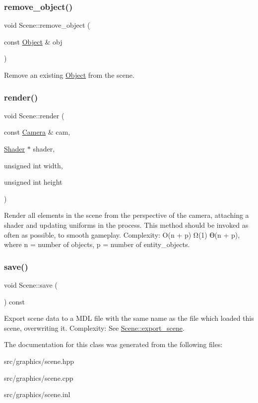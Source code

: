 \subsubsection{\texorpdfstring{remove\+\_\+object()}{remove\_object()}}
{\footnotesize\ttfamily void Scene\+::remove\+\_\+object (\begin{DoxyParamCaption}\item[{const \mbox{\hyperlink{class_object}{Object}} \&}]{obj }\end{DoxyParamCaption})}

Remove an existing \mbox{\hyperlink{class_object}{Object}} from the scene. \mbox{\label{class_scene_a6e27640f9973c00e12cf6736bd3c01ad}} 
\subsubsection{\texorpdfstring{render()}{render()}}
{\footnotesize\ttfamily void Scene\+::render (\begin{DoxyParamCaption}\item[{const \mbox{\hyperlink{class_camera}{Camera}} \&}]{cam,  }\item[{\mbox{\hyperlink{class_shader}{Shader}} $\ast$}]{shader,  }\item[{unsigned int}]{width,  }\item[{unsigned int}]{height }\end{DoxyParamCaption})}

Render all elements in the scene from the perspective of the camera, attaching a shader and updating uniforms in the process. This method should be invoked as often as possible, to smooth gameplay. Complexity\+: O(n + p) Ω(1) ϴ(n + p), where n = number of objects, p = number of entity\+\_\+objects. \mbox{\label{class_scene_a6063cdee2eaaf56fd8bf91ba961007f4}} 
\subsubsection{\texorpdfstring{save()}{save()}}
{\footnotesize\ttfamily void Scene\+::save (\begin{DoxyParamCaption}{ }\end{DoxyParamCaption}) const}

Export scene data to a M\+DL file with the same name as the file which loaded this scene, overwriting it. Complexity\+: See \mbox{\hyperlink{class_scene_a65b10c0a127b5f811869a605b70c5a72}{Scene\+::export\+\_\+scene}}. 

The documentation for this class was generated from the following files\+:\begin{DoxyCompactItemize}
\item 
src/graphics/scene.\+hpp\item 
src/graphics/scene.\+cpp\item 
src/graphics/scene.\+inl\end{DoxyCompactItemize}
